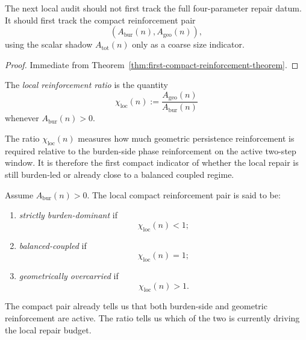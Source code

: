 \begin{corollary}
\label{cor:current-compact-reinforcement-working-rule}
The next local audit should not first track the full four-parameter repair datum.
It should first track the compact reinforcement pair
\[
  (A_{\mathrm{bur}}(n),A_{\mathrm{geo}}(n)),
\]
using the scalar shadow $A_{\mathrm{tot}}(n)$ only as a coarse size indicator.
\end{corollary}

\begin{proof}
Immediate from Theorem~\ref{thm:first-compact-reinforcement-theorem}.
\end{proof}


\begin{definition}
\label{def:local-reinforcement-ratio}
The \emph{local reinforcement ratio} is the quantity
\[
  \chi_{\mathrm{loc}}(n)
  :=
  \frac{A_{\mathrm{geo}}(n)}{A_{\mathrm{bur}}(n)}
\]
whenever $A_{\mathrm{bur}}(n)>0$.
\end{definition}

\begin{remark}
\label{rem:meaning-of-the-local-reinforcement-ratio}
The ratio $\chi_{\mathrm{loc}}(n)$ measures how much geometric persistence reinforcement is required relative to the burden-side phase reinforcement on the active two-step window.
It is therefore the first compact indicator of whether the local repair is still burden-led or already close to a balanced coupled regime.
\end{remark}

\begin{definition}
\label{def:local-reinforcement-regime-classes}
Assume $A_{\mathrm{bur}}(n)>0$.
The local compact reinforcement pair is said to be:
\begin{enumerate}[leftmargin=2em,label=(\alph*)]
  \item \emph{strictly burden-dominant} if
  \[
    \chi_{\mathrm{loc}}(n)<1;
  \]
  \item \emph{balanced-coupled} if
  \[
    \chi_{\mathrm{loc}}(n)=1;
  \]
  \item \emph{geometrically overcarried} if
  \[
    \chi_{\mathrm{loc}}(n)>1.
  \]
\end{enumerate}
\end{definition}

\begin{remark}
\label{rem:why-the-ratio-matters}
The compact pair already tells us that both burden-side and geometric reinforcement are active.
The ratio tells us which of the two is currently driving the local repair budget.
\end{remark}


